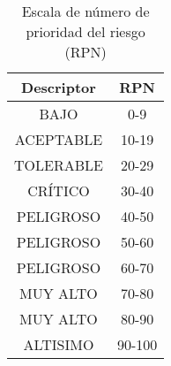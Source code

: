 \begin{table}[htbp]
	\caption{Escala de número de prioridad del riesgo (RPN)}
	\label{tab:rpn}
	\centering
	\begin{tabular}{cc}
		\hline
		Descriptor & RPN \\
		\hline
		BAJO & \cellcolor{GreenColor}0-9 \\
		ACEPTABLE & \cellcolor{GreenColor!50}10-19 \\
		TOLERABLE & \cellcolor{GreenColor!30}20-29 \\
		\hline
		CRÍTICO & \cellcolor{LightRed}30-40 \\
		PELIGROSO & \cellcolor{RedColor!50}40-50 \\
		PELIGROSO  & \cellcolor{RedColor!60}50-60 \\	
		PELIGROSO  & \cellcolor{RedColor!70}60-70 \\
		MUY ALTO & \cellcolor{RedColor!80}70-80 \\
		MUY ALTO & \cellcolor{RedColor!90}80-90 \\
		ALTISIMO & \cellcolor{RedColor}90-100 \\
		\hline
	\end{tabular}
\end{table}

